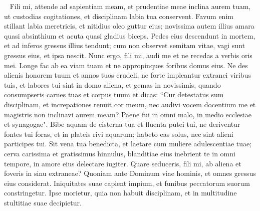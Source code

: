 \begin{biblechapter}   
\verse Fili mi, attende ad sapientiam meam, et prudentiae meae inclina aurem tuam, 
\verse ut custodias cogitationes, et disciplinam labia tua conservent. 
\verse Favum enim stillant labia meretricis, et nitidius oleo guttur eius; 
\verse novissima autem illius amara quasi absinthium et acuta quasi gladius biceps. 
\verse Pedes eius descendunt in mortem, et ad inferos gressus illius tendunt; 
\verse cum non observet semitam vitae, vagi sunt gressus eius, et ipsa nescit. 
\verse Nunc ergo, fili mi, audi me et ne recedas a verbis oris mei. 
\verse Longe fac ab ea viam tuam et ne appropinques foribus domus eius. 
\verse Ne des alienis honorem tuum et annos tuos crudeli, 
\verse ne forte impleantur extranei viribus tuis, et labores tui sint in domo aliena, 
\verse et gemas in novissimis, quando consumpseris carnes tuas et corpus tuum 
\verse et dicas: “Cur detestatus sum disciplinam, et increpationes renuit cor meum, 
\verse nec audivi vocem docentium me et magistris non inclinavi aurem meam? 
\verse Paene fui in omni malo, in medio ecclesiae et synagogae". 
\verse Bibe aquam de cisterna tua et fluenta putei tui, 
\verse ne deriventur fontes tui foras, et in plateis rivi aquarum; 
\verse habeto eas solus, nec sint alieni participes tui. 
\verse Sit vena tua benedicta, et laetare cum muliere adulescentiae tuae; 
\verse cerva carissima et gratissimus hinnulus, blanditiae eius inebrient te in omni tempore, in amore eius delectare iugiter. 
\verse Quare seduceris, fili mi, ab aliena et foveris in sinu extraneae? 
\verse Quoniam ante Dominum viae hominis, et omnes gressus eius considerat. 
\verse Iniquitates suae capient impium, et funibus peccatorum suorum constringetur. 
\verse Ipse morietur, quia non habuit disciplinam, et in multitudine stultitiae suae decipietur. 
\end{biblechapter}

